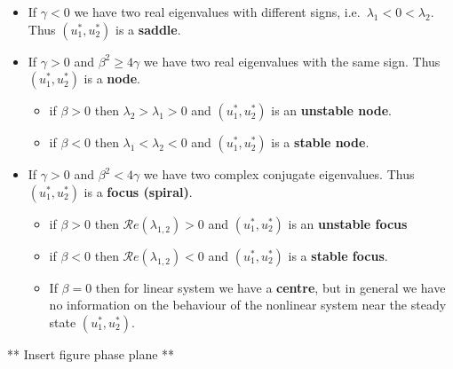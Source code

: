\documentclass[
  letterpaper,
  DIV=11,
  numbers=noendperiod]{scrreprt}
\providecommand{\tightlist}{%
  \setlength{\itemsep}{0pt}\setlength{\parskip}{0pt}}\usepackage{longtable,booktabs,array}
\theoremstyle{plain}
\theoremstyle{definition}
\theoremstyle{plain}
\theoremstyle{remark}
\begin{document}
\begin{itemize}
\item
  If \(\gamma <0\) we have two real eigenvalues with different signs,
  i.e.~\(\lambda_1 < 0 < \lambda_2\). Thus \((u^\ast_1, u^\ast_2)\) is a
  \textbf{saddle}.
\item
  If \(\gamma >0\) and \(\beta^2 \geq 4\gamma\) we have two real
  eigenvalues with the same sign. Thus \((u^\ast_1, u^\ast_2)\) is a
  \textbf{node}.

  \begin{itemize}
  \tightlist
  \item
    if \(\beta >0\) then \(\lambda_2 > \lambda_1 >0\) and
    \((u^\ast_1, u^\ast_2)\) is an \textbf{unstable node}.
  \item
    if \(\beta <0\) then \(\lambda_1 < \lambda_2 < 0\) and
    \((u^\ast_1, u^\ast_2)\) is a \textbf{stable node}.
  \end{itemize}
\item
  If \(\gamma >0\) and \(\beta^2 < 4\gamma\) we have two complex
  conjugate eigenvalues. Thus \((u^\ast_1, u^\ast_2)\) is a
  \textbf{focus (spiral)}.

  \begin{itemize}
  \item
    if \(\beta >0\) then \(\mathcal Re(\lambda_{1,2}) > 0\) and
    \((u^\ast_1, u^\ast_2)\) is an \textbf{unstable focus}
  \item
    if \(\beta <0\) then \(\mathcal Re(\lambda_{1,2}) < 0\) and
    \((u^\ast_1, u^\ast_2)\) is a \textbf{stable focus}.
  \item
    If \(\beta =0\) then for linear system we have a \textbf{centre},
    but in general we have no information on the behaviour of the
    nonlinear system near the steady state \((u^\ast_1, u^\ast_2)\).
  \end{itemize}
\end{itemize}

** Insert figure phase plane **
\end{document}
